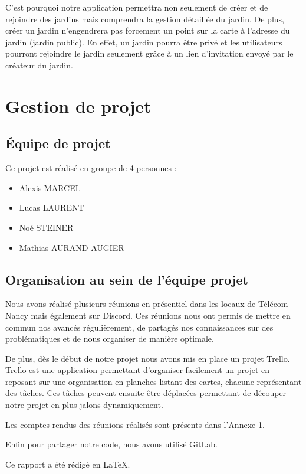 \documentclass[french,a4paper]{article}
\begin{document}
C’est pourquoi notre application permettra non seulement de créer et de rejoindre des jardins mais comprendra la gestion détaillée du jardin. De plus, créer un jardin n’engendrera pas forcement un point sur la carte à l’adresse du jardin (jardin public). En effet, un jardin pourra être privé et les utilisateurs pourront rejoindre le jardin seulement grâce à un lien d’invitation envoyé par le créateur du jardin.


\newpage
\section{Gestion de projet}
\subsection{Équipe de projet}
Ce projet est réalisé en groupe de 4 personnes : 
\begin{itemize}
    \item Alexis MARCEL
    \item Lucas LAURENT
    \item Noé STEINER
    \item Mathias AURAND-AUGIER
\end{itemize}
\subsection{Organisation au sein de l’équipe projet}
Nous avons réalisé plusieurs réunions en présentiel dans les locaux de Télécom Nancy mais également sur Discord. Ces réunions nous ont permis de mettre en commun nos avancés régulièrement, de partagés nos connaissances sur des problématiques et de nous organiser de manière optimale.

De plus, dès le début de notre projet nous avons mis en place un projet Trello. Trello est une application permettant d’organiser facilement un projet en reposant sur une organisation en planches listant des cartes, chacune représentant des tâches. Ces tâches peuvent ensuite être déplacées permettant de découper notre projet en plus jalons dynamiquement.

Les comptes rendus des réunions réalisés sont présents dans l’Annexe 1.

Enfin pour partager notre code, nous avons utilisé GitLab.

Ce rapport a été rédigé en \LaTeX.
\end{document}
